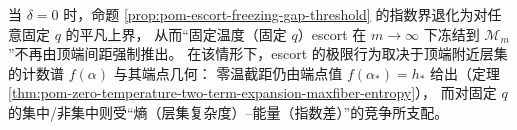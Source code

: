 \begin{remark}\label{rem:pom-top-gap-degenerate-flat-top}
当 \(\delta=0\) 时，命题 \ref{prop:pom-escort-freezing-gap-threshold} 的指数界退化为对任意固定 \(q\) 的平凡上界，
从而“固定温度（固定 \(q\)）escort 在 \(m\to\infty\) 下冻结到 \(\mathcal{M}_m\)”不再由顶端间距强制推出。
在该情形下，escort 的极限行为取决于顶端附近层集的计数谱 \(f(\alpha)\) 与其端点几何：
零温截距仍由端点值 \(f(\alpha_\ast)=h_\ast\) 给出（定理 \ref{thm:pom-zero-temperature-two-term-expansion-maxfiber-entropy}），
而对固定 \(q\) 的集中/非集中则受“熵（层集复杂度）--能量（指数差）”的竞争所支配。
\end{remark}





